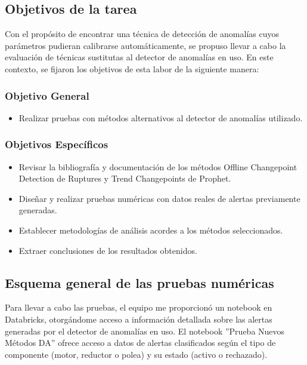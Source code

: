 \documentclass{article}[14pts]
\begin{document}
  \subsection{Objetivos de la tarea}

    Con el propósito de encontrar una técnica de detección de anomalías cuyos parámetros pudieran calibrarse 
    automáticamente, se propuso llevar a cabo la evaluación de técnicas sustitutas al detector de anomalías en uso. 
    En este contexto, se fijaron los objetivos de esta labor de la siguiente manera:

      \subsubsection{Objetivo General}

        \begin{itemize}
          \item Realizar pruebas con métodos alternativos al detector de anomalías utilizado.
        \end{itemize}

      \subsubsection{Objetivos Específicos}

          \begin{itemize}
              \item Revisar la bibliografía y documentación de los métodos Offline Changepoint Detection de Ruptures y
              Trend Changepoints de Prophet.
              
              \item Diseñar y realizar pruebas numéricas con datos reales de alertas previamente generadas.
              
              \item Establecer metodologías de análisis acordes a los métodos seleccionados.
              
              \item Extraer conclusiones de los resultados obtenidos.
          \end{itemize}

  \subsection{Esquema general de las pruebas numéricas}
  
    Para llevar a cabo las pruebas, el equipo me proporcionó un notebook en Databricks, otorgándome acceso a información detallada sobre las alertas generadas por el detector de anomalías en uso. El notebook ''Prueba Nuevos Métodos DA'' ofrece acceso a datos de alertas clasificados según el tipo de componente (motor, reductor o polea) y su estado (activo o rechazado). 
\end{document}
